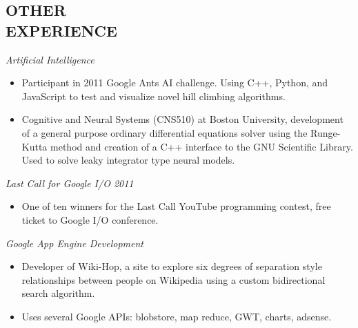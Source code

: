 \documentclass[line,margin]{res}
\begin{document}
\begin{resume}
  \section{OTHER\\EXPERIENCE}
          \emph{Artificial Intelligence}
          \begin{itemize} \itemsep -2pt
          \item
            Participant in 2011 Google Ants AI challenge. Using C++, Python, and JavaScript to test
            and visualize novel hill climbing algorithms.
          \item
            Cognitive and Neural Systems (CNS510) at Boston University,
            development of a general purpose ordinary differential equations solver using the Runge-Kutta
            method and creation of a C++ interface to the GNU Scientific Library. Used to solve leaky
            integrator type neural models.
          \end{itemize}


          \emph{Last Call for Google I/O 2011}
          \begin{itemize} \itemsep -2pt
          \item
            One of ten winners for the Last Call YouTube programming contest, free ticket to Google I/O conference.
          \end{itemize}

          \emph{Google App Engine Development}
          \begin{itemize} \itemsep -2pt
          \item
            Developer of Wiki-Hop, a site to explore six degrees of separation style
            relationships between people on Wikipedia using a custom bidirectional search algorithm.
          \item
            Uses several Google APIs: blobstore, map reduce, GWT, charts, adsense.
          \end{itemize}


\end{resume}
\end{document}

